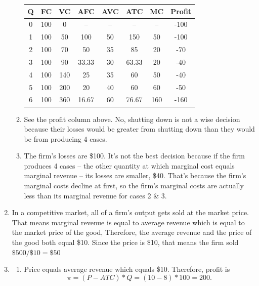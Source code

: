 \documentclass{article}
\begin{document}
\begin{enumerate}
\begin{enumerate}
		\begin{center}
		\begin{tabular}{| c | c | c | c | c | c | c | c |}
		\hline
		Q & FC & VC & AFC & AVC & ATC & MC & Profit \\
		\hline
		0 & 100 & 0 & -- & -- & -- & -- & -100 \\
		\hline
		1 & 100 & 50 & 100 & 50 & 150 & 50 & -100 \\
		\hline
		2 & 100 & 70 & 50 & 35 & 85 & 20 & -70\\
		\hline
		3 & 100 & 90 & 33.33 & 30 & 63.33 & 20 & -40 \\
		\hline
		4 & 100 & 140 & 25 & 35 & 60 & 50 & -40 \\
		\hline
		5 & 100 & 200 & 20 & 40 & 60 & 60 & -50\\
		\hline
		6 & 100 & 360 & 16.67 & 60 & 76.67 & 160 & -160\\
		\hline
		\end{tabular}
		\end{center}
		
	\item See the profit column above. No, shutting down is not a wise decision because their losses would be greater from shutting down than they would be from producing 4 cases.
	
	\item The firm's losses are \$100. It's not the best decision because if the firm produces 4 cases -- the other quantity at which marginal cost equals marginal revenue -- its losses are smaller, \$40. That's because the firm's marginal costs decline at first, so the firm's marginal costs are actually less than its marginal revenue for cases 2 \& 3. 
	
	\end{enumerate}

\setcounter{enumi}{5}	
\item In a competitive market, all of a firm's output gets sold at the market price. That means marginal revenue is equal to average revenue which is equal to the market price of the good, Therefore, the average revenue and the price of the good both equal \$10. Since the price is \$10, that means the firm sold $\$500 / \$10 = \$50$

\item

	\begin{enumerate}
	
	\item Price equals average revenue which equals \$10. Therefore, profit is \[\pi = (P - ATC)*Q = (10 - 8)*100 = 200.\]
	

\end{enumerate}
\end{enumerate}
\end{document}
